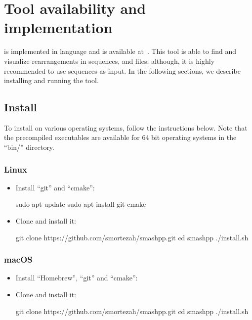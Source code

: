 \clearpage
\section{Tool availability and implementation}
\label{sec.tool}
\smashpp is implemented in \cpp language and is available at~\cite{web-smashpp}. This tool is able to find and visualize rearrangements in sequences, \fasta and \fastq files; although, it is highly recommended to use sequences as input. In the following sections, we describe installing and running the \smashpp tool.

\subsection{Install}
To install \smashpp on various operating systems, follow the instructions below. Note that the precompiled executables are available for 64 bit operating systems in the ``bin/'' directory.


\subsubsection*{Linux}
\begin{itemize}
  \item Install ``git'' and ``cmake'':
\begin{code}[style=bash]
sudo apt update
sudo apt install git cmake
\end{code}
\item Clone \smashpp and install it:
\begin{code}[style=bash]
git clone https://github.com/smortezah/smashpp.git
cd smashpp
./install.sh
\end{code}
\end{itemize}

\subsubsection*{macOS}
\begin{itemize}
    \item Install ``Homebrew'', ``git'' and ``cmake'':
\item Clone \smashpp and install it:
\begin{code}[style=bash]
git clone https://github.com/smortezah/smashpp.git
cd smashpp
./install.sh
\end{code}
\end{itemize}

